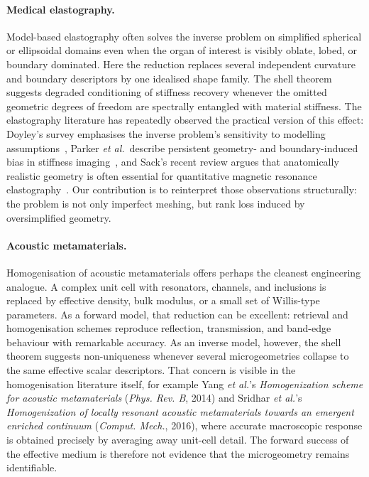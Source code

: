 \paragraph{Medical elastography.}
Model-based elastography often solves the inverse problem on simplified
spherical or ellipsoidal domains even when the organ of interest is visibly
oblate, lobed, or boundary dominated.  Here the reduction replaces several
independent curvature and boundary descriptors by one idealised shape family.
The shell theorem suggests degraded conditioning of
stiffness recovery whenever the omitted geometric degrees of freedom are
spectrally entangled with material stiffness.  The elastography literature has
repeatedly observed the practical version of this effect: Doyley's survey
emphasises the inverse problem's sensitivity to modelling assumptions~\cite{Doyley2012},
Parker \emph{et al.}\ describe persistent geometry- and boundary-induced bias in
stiffness imaging~\cite{parker2011imaging}, and Sack's recent review argues that
anatomically realistic geometry is often essential for quantitative magnetic
resonance elastography~\cite{Sack2023}.  Our contribution is to reinterpret
those observations structurally: the problem is not only imperfect meshing, but
rank loss induced by oversimplified geometry.

\paragraph{Acoustic metamaterials.}
Homogenisation of acoustic metamaterials offers perhaps the cleanest engineering
analogue.  A complex unit cell with resonators, channels, and inclusions is
replaced by effective density, bulk modulus, or a small set of Willis-type
parameters.  As a forward model, that reduction can be excellent: retrieval and
homogenisation schemes reproduce reflection, transmission, and band-edge
behaviour with remarkable accuracy.  As an inverse model, however,
the shell theorem suggests non-uniqueness whenever several
microgeometries collapse to the same effective scalar descriptors.  That
concern is visible in the homogenisation literature itself, for example Yang
\emph{et al.}'s \emph{Homogenization scheme for acoustic metamaterials}
(\emph{Phys. Rev. B}, 2014) and Sridhar \emph{et al.}'s \emph{Homogenization of
locally resonant acoustic metamaterials towards an emergent enriched continuum}
(\emph{Comput. Mech.}, 2016), where accurate macroscopic response is obtained
precisely by averaging away unit-cell detail.  The forward success of the
effective medium is therefore not evidence that the microgeometry remains
identifiable.

